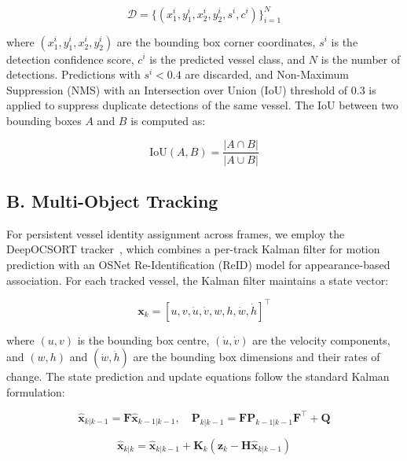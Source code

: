 \documentclass{ieeeaccess}
\begin{document}
\begin{equation}
\mathcal{D} = \{(x_1^i, y_1^i, x_2^i, y_2^i, s^i, c^i)\}_{i=1}^{N}
\end{equation}

where $(x_1^i, y_1^i, x_2^i, y_2^i)$ are the bounding box corner 
coordinates, $s^i$ is the detection confidence score, $c^i$ is the 
predicted vessel class, and $N$ is the number of detections. Predictions 
with $s^i < 0.4$ are discarded, and Non-Maximum Suppression (NMS) with 
an Intersection over Union (IoU) threshold of 0.3 is applied to suppress 
duplicate detections of the same vessel. The IoU between two bounding 
boxes $A$ and $B$ is computed as:

\begin{equation}
\text{IoU}(A, B) = \frac{|A \cap B|}{|A \cup B|}
\end{equation}

\subsection*{B. Multi-Object Tracking}

For persistent vessel identity assignment across frames, we employ 
the DeepOCSORT tracker~\cite{b7}, which combines a per-track Kalman 
filter for motion prediction with an OSNet Re-Identification (ReID) 
model for appearance-based association. For each tracked vessel, the 
Kalman filter maintains a state vector:

\begin{equation}
\mathbf{x}_k = [u, v, \dot{u}, \dot{v}, w, h, \dot{w}, \dot{h}]^\top
\end{equation}

where $(u, v)$ is the bounding box centre, $(\dot{u}, \dot{v})$ are 
the velocity components, and $(w, h)$ and $(\dot{w}, \dot{h})$ are 
the bounding box dimensions and their rates of change. The state 
prediction and update equations follow the standard Kalman formulation:

\begin{equation}
\hat{\mathbf{x}}_{k|k-1} = \mathbf{F}\hat{\mathbf{x}}_{k-1|k-1}, 
\quad \mathbf{P}_{k|k-1} = \mathbf{F}\mathbf{P}_{k-1|k-1}\mathbf{F}^\top + \mathbf{Q}
\end{equation}

\begin{equation}
\hat{\mathbf{x}}_{k|k} = \hat{\mathbf{x}}_{k|k-1} + \mathbf{K}_k
(\mathbf{z}_k - \mathbf{H}\hat{\mathbf{x}}_{k|k-1})
\end{equation}
\end{document}
